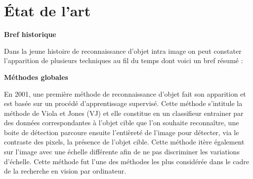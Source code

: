 \documentclass[a4paper,12pt]{article} %
\begin{document}
\section{État de l'art} %
\textbf{Bref historique}\newline
\par
	Dans la jeune histoire de reconnaissance d’objet intra image on peut constater l’apparition de plusieurs techniques au fil du temps dont voici un bref résumé :\newline

\textbf{Méthodes globales}\newline
\par
	En 2001, une première méthode de reconnaissance d’objet fait son apparition et est basée sur un procédé d’apprentissage supervisé. Cette méthode s’intitule la méthode de Viola et Jones (VJ) et elle constitue en un classifieur entrainer par des données correspondantes à l’objet cible que l’on souhaite reconnaître, une boite de détection parcoure ensuite l’entièreté de l’image pour détecter, via le contraste des pixels, la présence de l’objet cible. Cette méthode itère également sur l’image avec une échelle différente afin de ne pas discriminer les variations d’échelle. Cette méthode fut l’une des méthodes les plus considérée dans le cadre de la recherche en vision par ordinateur.\newline
\end{document}
